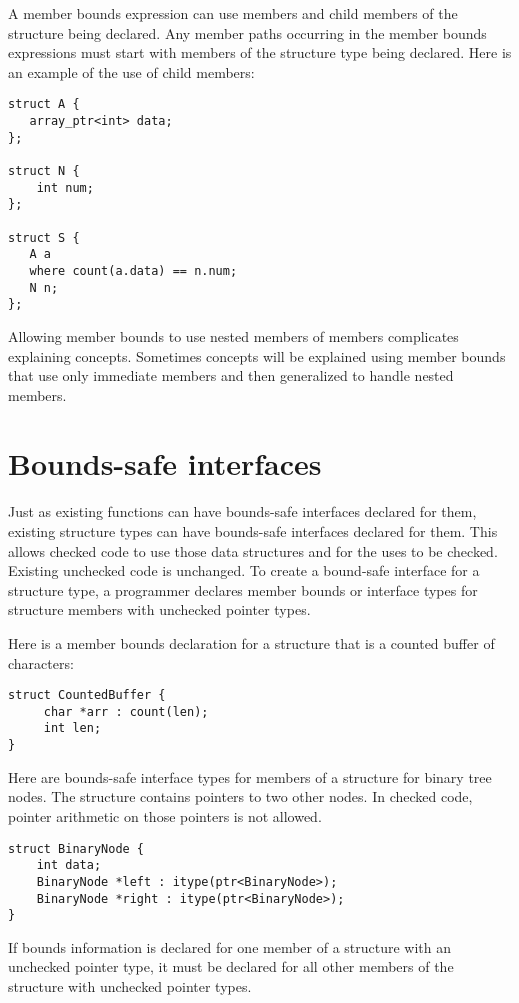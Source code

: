 A member bounds expression can use members and child members of the
structure being declared. Any member paths occurring in the member
bounds expressions must start with members of the structure type being
declared. Here is an example of the use of child members:

\begin{lstlisting}
struct A {
   array_ptr<int> data;
};

struct N {
    int num;
};

struct S {
   A a
   where count(a.data) == n.num;
   N n;
};
\end{lstlisting}

Allowing member bounds to use nested members of members complicates
explaining concepts. Sometimes concepts will be explained using member
bounds that use only immediate members and then generalized to handle
nested members.

\section{Bounds-safe interfaces}
\label{section:structure-bounds-safe-interfaces}

Just as existing functions can have bounds-safe interfaces declared for
them, existing structure types can have bounds-safe interfaces declared
for them. This allows checked code to use those data structures and for
the uses to be checked. Existing unchecked code is unchanged.
To create a bound-safe interface for a structure type, a programmer
declares member bounds or interface types for structure members with
unchecked pointer types.

Here is a member bounds declaration for a structure that is a counted buffer
of characters:

\begin{lstlisting}
struct CountedBuffer {
     char *arr : count(len);
     int len;
}
\end{lstlisting}

Here are bounds-safe interface types for members of a structure for binary
tree nodes. The structure contains pointers to two other nodes.  In
checked code, pointer arithmetic on those pointers is not allowed.

\begin{lstlisting}
struct BinaryNode {
    int data;
    BinaryNode *left : itype(ptr<BinaryNode>);
    BinaryNode *right : itype(ptr<BinaryNode>);
}
\end{lstlisting}

If bounds information is declared for one member of a structure with an
unchecked pointer type, it must be declared for all other members of the
structure with unchecked pointer types.

